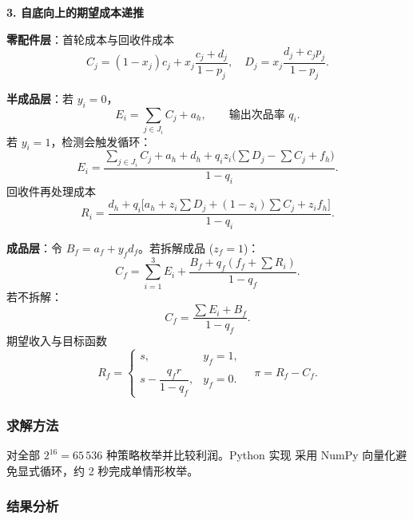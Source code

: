 \documentclass[withoutpreface,bwprint]{cumcmthesis}
\begin{document}
\textbf{3. 自底向上的期望成本递推}

\textbf{零配件层}：首轮成本与回收件成本
\begin{equation}
    C_j = (1 - x_j) c_j + x_j \frac{c_j + d_j}{1 - p_j}, \quad
    D_j = x_j \frac{d_j + c_j p_j}{1 - p_j}.
\end{equation}

\textbf{半成品层}：若 $y_i = 0$，
\begin{equation}
    E_i = \sum_{j \in J_i} C_j + a_h, \qquad \text{输出次品率 } q_i.
\end{equation}
若 $y_i = 1$，检测会触发循环：
\begin{equation}
    E_i = \frac{
        \sum_{j \in J_i} C_j + a_h + d_h
        + q_i z_i \bigl( \sum D_j - \sum C_j + f_h \bigr)
    }{1 - q_i}.
\end{equation}
回收件再处理成本
\begin{equation}
    R_i = \frac{
        d_h + q_i \bigl[ a_h + z_i \sum D_j + (1 - z_i) \sum C_j + z_i f_h \bigr]
    }{1 - q_i}.
\end{equation}

\textbf{成品层}：令 $B_f = a_f + y_f d_f$。若拆解成品
($z_f = 1$)：
\begin{equation}
    C_f = \sum_{i=1}^{3} E_i + \frac{B_f + q_f (f_f + \sum R_i)}{1 - q_f}.
\end{equation}
若不拆解：
\begin{equation}
    C_f = \frac{\sum E_i + B_f}{1 - q_f}.
\end{equation}
期望收入与目标函数
\begin{equation}
    R_f = \begin{cases}
        s, & y_f = 1, \\[2mm]
        s - \dfrac{q_f r}{1 - q_f}, & y_f = 0.
    \end{cases}
    \quad \pi = R_f - C_f.
\end{equation}

\subsubsection{求解方法}

对全部 $2^{16} = 65\,536$ 种策略枚举并比较利润。Python 实现
采用 NumPy 向量化避免显式循环，约 2 秒完成单情形枚举。

\subsubsection{结果分析}
\end{document}

